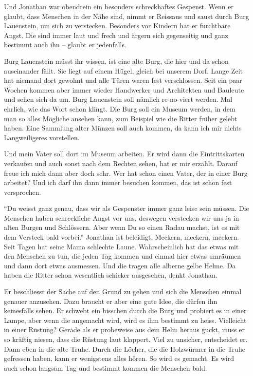 Und Jonathan war obendrein ein besonders schreckhaftes Gespenst. Wenn er glaubt, dass Menschen in der Nähe sind, nimmt er Reissaus und saust durch Burg Lauenstein, um sich zu verstecken. Besonders vor Kindern hat er furchtbare Angst. Die sind immer laut und frech und ärgern sich gegenseitig und ganz bestimmt auch ihn -- glaubt er jedenfalls. 

\begin{mdframed}[style=mystyle]
Burg Lauenstein müsst ihr wissen, ist eine alte Burg, die hier und da schon auseinander fällt. Sie liegt auf einem Hügel, gleich bei unserem Dorf. Lange Zeit hat niemand dort gewohnt und alle Türen waren fest verschlossen. Seit ein paar Wochen kommen aber immer wieder Handwerker und Architekten und Bauleute und sehen sich da um. Burg Lauenstein soll nämlich re-no-viert werden. Mal ehrlich, wie das Wort schon klingt. Die Burg soll ein Museum werden, in dem man so alles Mögliche ansehen kann, zum Beispiel wie die Ritter früher gelebt haben. Eine Sammlung alter Münzen soll auch kommen, da kann ich mir nichts Langweiligeres vorstellen. 

Und mein Vater soll dort im Museum arbeiten. Er wird dann die Eintrittskarten verkaufen und auch sonst nach dem Rechten sehen, hat er mir erzählt. Darauf freue ich mich dann aber doch sehr. Wer hat schon einen Vater, der in einer Burg arbeitet? Und ich darf ihn dann immer besuchen kommen, das ist schon fest versprochen.
\end{mdframed}

\enquote{Du weisst ganz genau, dass wir als Gespenster immer ganz leise sein
müssen. Die Menschen haben schreckliche Angst vor uns, deswegen verstecken wir
uns ja in alten Burgen und Schlössern. Aber wenn Du so einen Radau machst, ist
es mit dem Versteck bald vorbei.} Jonathan ist beleidigt. Meckern, meckern,
meckern. Seit Tagen hat seine Mama schlechte Laune. Wahrscheinlich hat das
etwas mit den Menschen zu tun, die jeden Tag kommen und einmal hier etwas
umräumen und dann dort etwas ausmessen. Und die tragen alle alberne gelbe Helme. Da haben die Ritter schon wesentlich schicker ausgesehen, denkt Jonathan. 

Er beschliesst der Sache auf den Grund zu gehen und sich die Menschen einmal genauer anzusehen. Dazu braucht er aber eine gute Idee, die dürfen ihn keinesfalls sehen. Er schwebt ein bisschen durch die Burg und probiert es in einer Lampe, aber wenn die angemacht wird, wird es ihm bestimmt zu heiss. Vielleicht in einer Rüstung? Gerade als er probeweise aus dem Helm heraus guckt, muss er so kräftig niesen, dass die Rüstung laut klappert. Viel zu unsicher, entscheidet er. Dann eben in die alte Truhe. Durch die Löcher, die die Holzwürmer in die Truhe gefressen haben, kann er wenigstens alles hören. So wird es gemacht. Es wird auch schon langsam Tag und bestimmt kommen die Menschen bald.  

